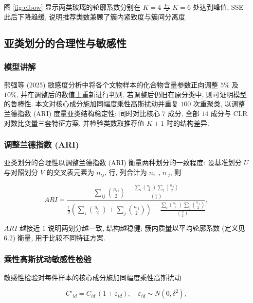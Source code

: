 \documentclass{ctexart}
\begin{document}
图 \ref{fig:elbow} 显示两类玻璃的轮廓系数分别在 $K=4$ 与 $K=6$ 处达到峰值, SSE 此后下降趋缓, 说明推荐类数兼顾了簇内紧致度与簇间分离度.

\subsection{亚类划分的合理性与敏感性}

\subsubsection{模型讲解}

熊强等 (2025) 敏感度分析中将各个文物样本的化合物含量参数正向调整 $5\%$ 及 $10\%$, 并在调整后的数值上重新进行判别, 若调整后仍旧在原分类中, 则可证明模型的鲁棒性. 本文对核心成分施加同幅度乘性高斯扰动并重复 $100$ 次重聚类, 以调整兰德指数 (ARI) 度量亚类结构稳定性; 同时对比核心 $7$ 成分, 全部 $14$ 成分与 CLR 对数比变量三套特征方案, 并检验类数取推荐值 $K\pm1$ 时的结构差异.


\subsubsection{调整兰德指数 (ARI)}

亚类划分的合理性以调整兰德指数 (ARI) 衡量两种划分的一致程度: 设基准划分 $U$ 与对照划分 $V$ 的交叉表元素为 $n_{ij}$, 行, 列合计为 $n_{i\cdot}$, $n_{\cdot{j}}$, 则

\begin{equation*}
ARI=\frac{\sum_{ij}\binom{n_{ij}}{2}-\frac{\sum_{i}\binom{n_{i\cdot}}{2}\,\sum_{j}\binom{n_{\cdot{j}}}{2}}{\binom{n}{2}}}{\frac{1}{2}\left(\sum_{i}\binom{n_{i\cdot}}{2}+\sum_{j}\binom{n_{\cdot{j}}}{2}\right)-\frac{\sum_{i}\binom{n_{i\cdot}}{2}\,\sum_{j}\binom{n_{\cdot{j}}}{2}}{\binom{n}{2}}},
\end{equation*}

$ARI$ 越接近 $1$ 说明两划分越一致, 结构越稳健; 簇内质量以平均轮廓系数 (定义见 6.2) 衡量, 用于比较不同特征方案.


\subsubsection{乘性高斯扰动敏感性检验}

敏感性检验对每件样本的核心成分施加同幅度乘性高斯扰动

\begin{equation*}
C'_{id}=C_{id}\,\left(1+\varepsilon_{id}\right),\quad\varepsilon_{id}\sim{N}\left(0,\delta^{2}\right),
\end{equation*}
\end{document}
